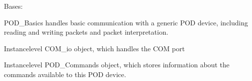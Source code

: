 \documentclass[letterpaper,10pt,english]{sphinxmanual}
\begin{document}
\begin{fulllineitems}
\label{\detokenize{BasicPodProtocol:BasicPodProtocol.POD_Basics}}
\pysigstartsignatures
{}
\pysigstopsignatures
\sphinxAtStartPar
Bases: 

\sphinxAtStartPar
POD\_Basics handles basic communication with a generic POD device, including reading and writing
packets and packet interpretation.

\begin{fulllineitems}
\label{\detokenize{BasicPodProtocol:BasicPodProtocol.POD_Basics._port}}
\pysigstartsignatures
{}
\pysigstopsignatures
\sphinxAtStartPar
Instance\sphinxhyphen{}level COM\_io object, which handles the COM port
\begin{quote}\begin{description}
\sphinxAtStartPar
{\hyperref[\detokenize{SerialCommunication:SerialCommunication.COM_io}]{}}

\end{description}\end{quote}

\end{fulllineitems}


\begin{fulllineitems}
\label{\detokenize{BasicPodProtocol:BasicPodProtocol.POD_Basics._commands}}
\pysigstartsignatures
{}
\pysigstopsignatures
\sphinxAtStartPar
Instance\sphinxhyphen{}level POD\_Commands object, which stores information about             the commands available to this POD device.
\begin{quote}\begin{description}
\sphinxAtStartPar
{\hyperref[\detokenize{PodCommands:PodCommands.POD_Commands}]{}}


\end{description}
\end{quote}
\end{fulllineitems}
\end{fulllineitems}
\end{document}
